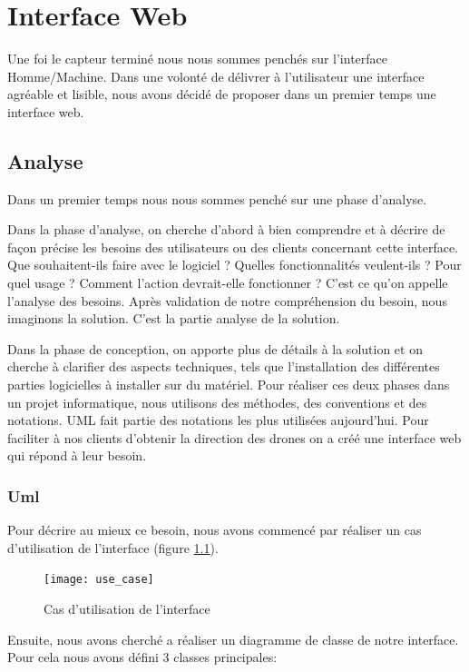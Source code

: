 
\chapter{Interface Web}
\label{Logiciel}

Une foi le capteur terminé nous nous sommes penchés sur l'interface Homme/Machine. Dans une volonté de délivrer à l'utilisateur une interface agréable et lisible, nous avons décidé de proposer dans un premier temps une interface web.

\section{Analyse}
\label{sec:uml}

Dans un premier temps nous nous sommes penché sur une  phase d'analyse.

Dans la phase d’analyse, on cherche d’abord à bien comprendre et à décrire de façon précise les besoins des utilisateurs ou des clients concernant cette interface. Que souhaitent-ils faire avec le logiciel ? Quelles fonctionnalités veulent-ils ? Pour quel usage ? Comment l’action devrait-elle fonctionner ? C’est ce qu’on appelle \og l’analyse des besoins\fg{}. Après validation de notre compréhension du besoin, nous imaginons la solution. C’est la partie analyse de la solution.

Dans la phase de conception, on apporte plus de détails à la solution et on cherche à clarifier des aspects techniques, tels que l’installation des différentes parties logicielles à installer sur du matériel. Pour réaliser ces deux phases dans un projet informatique, nous utilisons des méthodes, des conventions et des notations. UML fait partie des notations les plus utilisées aujourd’hui. Pour faciliter à nos clients d’obtenir la direction des drones on a créé une interface web qui répond à leur besoin.

\subsection{Uml}

Pour décrire au mieux ce besoin, nous avons commencé par réaliser un cas d'utilisation de l'interface (figure \ref{fig:use_case}).
\begin{figure}[!h]
  \centering
  \texttt{[image: use\_case]}
  \caption{Cas d'utilisation de l'interface}
  \label{fig:use_case}
\end{figure}

\newpage
Ensuite, nous avons cherché a réaliser un diagramme de classe de notre interface. Pour cela nous avons défini 3 classes principales:

